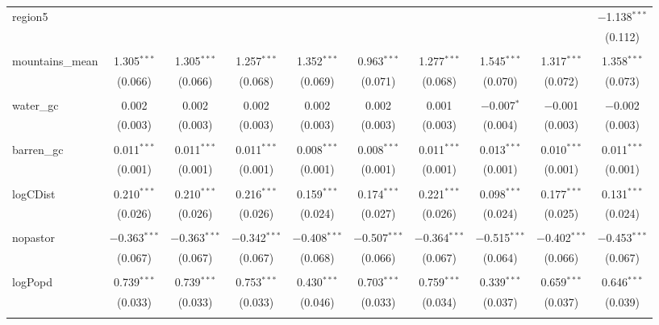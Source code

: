 \begin{table}[!htbp]
\begin{tabular}{@{\extracolsep{5pt}}lccccccccc}
 region5 &  &  &  &  &  &  &  &  & $-$1.138$^{***}$ \\ 
  &  &  &  &  &  &  &  &  & (0.112) \\ 
  & & & & & & & & & \\ 
 mountains\_mean & 1.305$^{***}$ & 1.305$^{***}$ & 1.257$^{***}$ & 1.352$^{***}$ & 0.963$^{***}$ & 1.277$^{***}$ & 1.545$^{***}$ & 1.317$^{***}$ & 1.358$^{***}$ \\ 
  & (0.066) & (0.066) & (0.068) & (0.069) & (0.071) & (0.068) & (0.070) & (0.072) & (0.073) \\ 
  & & & & & & & & & \\ 
 water\_gc & 0.002 & 0.002 & 0.002 & 0.002 & 0.002 & 0.001 & $-$0.007$^{*}$ & $-$0.001 & $-$0.002 \\ 
  & (0.003) & (0.003) & (0.003) & (0.003) & (0.003) & (0.003) & (0.004) & (0.003) & (0.003) \\ 
  & & & & & & & & & \\ 
 barren\_gc & 0.011$^{***}$ & 0.011$^{***}$ & 0.011$^{***}$ & 0.008$^{***}$ & 0.008$^{***}$ & 0.011$^{***}$ & 0.013$^{***}$ & 0.010$^{***}$ & 0.011$^{***}$ \\ 
  & (0.001) & (0.001) & (0.001) & (0.001) & (0.001) & (0.001) & (0.001) & (0.001) & (0.001) \\ 
  & & & & & & & & & \\ 
 logCDist & 0.210$^{***}$ & 0.210$^{***}$ & 0.216$^{***}$ & 0.159$^{***}$ & 0.174$^{***}$ & 0.221$^{***}$ & 0.098$^{***}$ & 0.177$^{***}$ & 0.131$^{***}$ \\ 
  & (0.026) & (0.026) & (0.026) & (0.024) & (0.027) & (0.026) & (0.024) & (0.025) & (0.024) \\ 
  & & & & & & & & & \\ 
 nopastor & $-$0.363$^{***}$ & $-$0.363$^{***}$ & $-$0.342$^{***}$ & $-$0.408$^{***}$ & $-$0.507$^{***}$ & $-$0.364$^{***}$ & $-$0.515$^{***}$ & $-$0.402$^{***}$ & $-$0.453$^{***}$ \\ 
  & (0.067) & (0.067) & (0.067) & (0.068) & (0.066) & (0.067) & (0.064) & (0.066) & (0.067) \\ 
  & & & & & & & & & \\ 
 logPopd & 0.739$^{***}$ & 0.739$^{***}$ & 0.753$^{***}$ & 0.430$^{***}$ & 0.703$^{***}$ & 0.759$^{***}$ & 0.339$^{***}$ & 0.659$^{***}$ & 0.646$^{***}$ \\ 
  & (0.033) & (0.033) & (0.033) & (0.046) & (0.033) & (0.034) & (0.037) & (0.037) & (0.039) \\ 
  & & & & & & & & & \\ 

\end{tabular}
\end{table}
